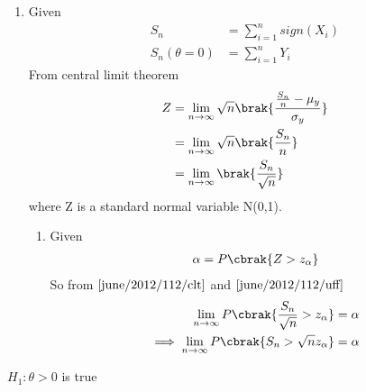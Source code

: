 \begin{enumerate}
\begin{align}
   \pr{Y=-1}=\pr{Y=1}=\frac{1}{2} 
\end{align}
So $Y=sign(X)$ is also symmetric around zero.
\begin{align}
   \implies \mu_y = 0 
\end{align}
and variance is
\begin{align}
    \sigma_y^2 &= (-1)^2\brak{\frac{1}{2}}+(1)^2\brak{\frac{1}{2}}\\
    &=1
\end{align}
\item Given
\begin{align}
    S_n&=\sum_{i=1}^{n} sign(X_i)\\
    S_n(\theta=0)&=\sum_{i=1}^{n} Y_i
\end{align}
From central limit theorem 
\begin{align}
    Z&=\lim_{n\to\infty}\sqrt{n}\brak{\frac{\frac{S_n}{n}-\mu_y}{\sigma_y}}\\
    &=\lim_{n\to\infty}\sqrt{n}\brak{\frac{S_n}{n}}\\
    &=\lim_{n\to\infty}\brak{\frac{S_n}{\sqrt{n}}}
    \label{june/2012/112/clt}
\end{align}
where Z is a standard normal variable N(0,1).
\begin{enumerate}
    \item Given
\begin{align}
    \alpha = P\cbrak{Z>z_\alpha}\label{june/2012/112/uff}
\end{align}
So from $\eqref{june/2012/112/clt}$ and $\eqref{june/2012/112/uff}$
\begin{align}
\lim_{n\to\infty}P\cbrak{\frac{S_n}{\sqrt{n}}>z_\alpha}&=
\alpha\\
\implies \lim_{n\to\infty}P\cbrak{S_n>\sqrt{n}z_\alpha}&=
\alpha
\end{align}
\end{enumerate}
\end{enumerate}
{$H_1:\theta >0$ is true}
